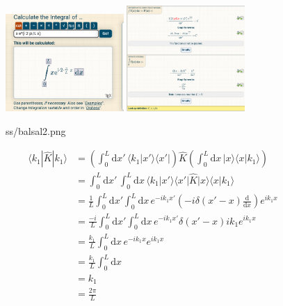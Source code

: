 \documentclass[letter]{article}
\begin{document}
\begin{figure}[H]
	\centering
	\includegraphics[width=0.4\textwidth]{ss/balsal1.png}
	\includegraphics[width=0.4\textwidth]{ss/balsal2.png}
	\caption{ss/balsal2.png}
	\label{fig:ss-balsal2-png}
\end{figure}


\begin{align*}
\langle k_1 | \hat{K} | k_1 \rangle &= 
\left(
	\int_{0}^{L}  
\mathrm{d} x' \, 
\langle k_1 | x' \rangle \langle x' |  
\right)
\hat{K} 
\left(
\int_{0}^{L} \mathrm{d} x \, 
| x \rangle \langle x | k_1 \rangle 
\right)
\\	
&= 
\int_{0}^{L} \mathrm{d} x' \, 
\int_{0}^{L}  \mathrm{d} x \, 
\langle k_1 | x' \rangle 
\langle x' | \hat{K} | x \rangle 
\langle x | k_1 \rangle 
\\
&= \frac{1}{L}
\int_{0}^{L} \mathrm{d} x'
\int_{0}^{L} \mathrm{d} x 
\, 
e^{-i k_1 x'} \left(- i \delta(x' - x) \frac{\mathrm{d} }{\mathrm{d} x}\right) e^{i k_1 x }
\\
&= \frac{-i}{L}
\int_{0}^{L} \mathrm{d} x'
\int_{0}^{L} \mathrm{d} x 
\, 
e^{-i k_1 x'} \delta(x' - x) i k_1 e^{i k_1 x }
\\
&= \frac{k_1}{L}
\int_{0}^{L} \mathrm{d} x 
\, 
e^{-i k_1 x}   e^{i k_1 x }
\\
&= 
\frac{k_1}{L} \int_{0}^{L} \mathrm{d} x  
\\
&= k_1 \\
&= \frac{2\pi}{L} \\
\end{align*}
\end{document}

